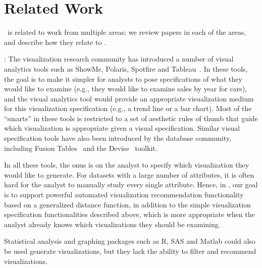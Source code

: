 

\section{Related Work}
\label{sec:related_work}
\SeeDB\ is related to work from multiple areas;
we review papers in each of the areas, and describe how they relate to
\SeeDB. 

:
The visualization 
research community has introduced a number of
visual analytics tools such as ShowMe, Polaris, Spotfire and 
Tableau~\cite{DBLP:journals/cacm/StolteTH08, DBLP:journals/tvcg/MackinlayHS07,spotfire}.
In these tools, the goal is to make it simpler for analysts 
to pose specifications of what they would like to examine
(e.g., they would like to examine sales by year for cars),
and the visual analytics tool would provide an appropriate
visualization medium for this visualization specification
(e.g., a trend line or a bar chart).
Most of the ``smarts'' in these tools is restricted
to a set of aesthetic rules of thumb that
guide which visualization is appropriate
given a visual specification.
Similar visual specification tools 
have also been introduced by the
database community, including Fusion
Tables~\cite{DBLP:conf/sigmod/GonzalezHJLMSSG10} and the
Devise~\cite{DBLP:conf/sigmod/LivnyRBCDLMW97} toolkit. 

In all these tools, the onus is on the analyst to specify
which visualization they would like to generate.
For datasets with a large number of attributes,
it is often hard for the analyst to manually study
every single attribute.
Hence, in \SeeDB, our goal is to support powerful
automated visualization recommendation functionality
based on a generalized distance function,
in addition to the simple visualization
specification functionalities described above,
which is more appropriate when the analyst already
knows which visualizations they should be examining.

Statistical analysis and graphing packages such as R, SAS and Matlab could also
be used generate visualizations, but they lack the ability to filter and
recommend visualizations. 


